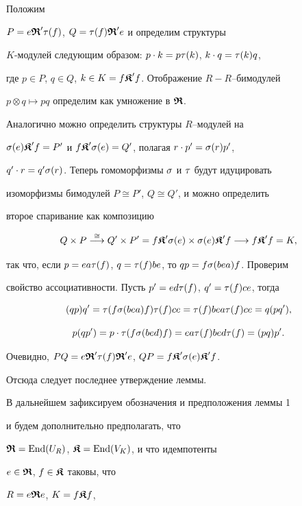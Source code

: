 \begin{pf} Положим


$P= e\boldsymbol{\frak R}'\tau(f) $, $Q=\tau(f)\boldsymbol{\frak R}' e $ и определим структуры


$K$-модулей следующим образом: $p\cdot k=p\tau(k)$, $k\cdot q=\tau(k)q$,


где $p\in P$, $q\in Q$, $k\in K=f\boldsymbol{\frak K}' f$. Отображение $R-R$--бимодулей


$p \otimes q \mapsto pq$ определим как умножение в $\boldsymbol{\frak R}$.


Аналогично можно определить структуры $R$--модулей на


$\sigma(e) \boldsymbol{\frak K}' f=P'$ и $f\boldsymbol{\frak K}' \sigma(e)=Q'$, полагая $r\cdot p'=\sigma(r)p'$,


$ q'\cdot r=q'\sigma(r)$. Теперь гомоморфизмы $\sigma$ и $\tau$ будут идуцировать


изоморфизмы бимодулей $P\cong P'$, $Q\cong Q'$, и можно определить


второе спаривание как композицию


$$


Q\times P\ar{\cong} Q'\times P' = f\K'\s(e)\times \s (e)\K'f\ar{}


f\K' f=K,


$$


так что, если $p=ea\tau(f)$, $q=\tau(f)be$, то $qp=f \sigma(bea) f$. Проверим


свойство ассоциативности. Пусть $p'=ed\tau(f)$, $q'=\tau(f) ce$, тогда


$$


(qp)q'=\t(f\s(bea)f)\t(f)ce=\t(f)bea\t(f)ce=q(pq'),


$$


$$


p(qp')=p\cdot\t(f\s(bed) f)=ea\t(f)bed\t(f)=(pq)p'.


$$


Очевидно, $PQ= e\boldsymbol{\frak R}' \tau(f) \boldsymbol{\frak R}' e $, $ QP=f\boldsymbol{\frak K}'\sigma(e)\boldsymbol{\frak K}' f$.


Отсюда следует последнее утверждение леммы.


\end{pf}





В дальнейшем зафиксируем обозначения и предположения леммы 1


и будем дополнительно предполагать, что


$\boldsymbol{\frak R} = {\operatorname{End}}(U_R)$, $\boldsymbol{\frak K} = {\operatorname{End}}(V_K)$, и что идемпотенты


$e\in \boldsymbol{\frak R}$, $f\in \boldsymbol{\frak K}$ таковы, что


$R = e \boldsymbol{\frak R} e$, $K = f \boldsymbol{\frak K} f$,


